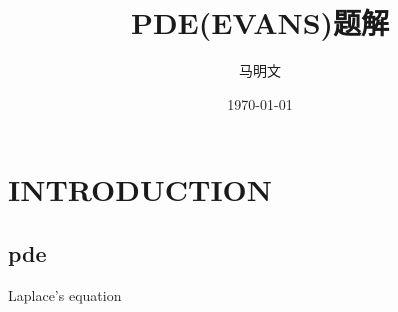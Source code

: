 \documentclass[leqno]{article}%
\title{PDE(EVANS)题解}
\author{马明文}
\date{\today}
\begin{document}
	\section{INTRODUCTION}
	\subsection{pde}
	Laplace's equation
	
	
	
	
	
	
	
	
	
\end{document}
